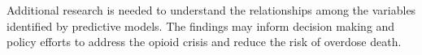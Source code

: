 \documentclass[sigconf]{acmart}
\begin{document}
Additional research 
is needed to understand the relationships among the variables identified by 
predictive models. The findings may inform decision making and policy efforts 
to address the opioid crisis and reduce the risk of overdose death. 


 
\end{document}
